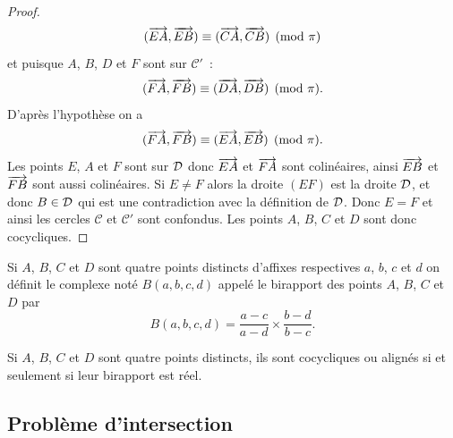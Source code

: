 \begin{proof}
\begin{equation}
  (\overrightarrow{EA},\overrightarrow{EB}) \equiv (\overrightarrow{CA},\overrightarrow{CB}) \pmod {\pi}  
\end{equation}
et puisque $A$, $B$, $D$ et $F$ sont sur $\mathcal{C}'$~:
\begin{equation}
  (\overrightarrow{FA},\overrightarrow{FB}) \equiv (\overrightarrow{DA},\overrightarrow{DB}) \pmod {\pi}.
\end{equation}
D'après l'hypothèse on a 
\begin{equation}
(\overrightarrow{FA},\overrightarrow{FB}) \equiv (\overrightarrow{EA},\overrightarrow{EB}) \pmod {\pi}.
\end{equation}
Les points $E$, $A$ et $F$ sont sur $\mathcal{D}$ donc $\overrightarrow{EA}$ et $\overrightarrow{FA}$ sont colinéaires, ainsi $\overrightarrow{EB}$ et $\overrightarrow{FB}$ sont aussi colinéaires. Si $E \neq F$ alors la droite $(EF)$ est la droite $\mathcal{D}$, et donc $B \in \mathcal{D}$ qui est une contradiction avec la définition de $\mathcal{D}$. Donc $E=F$ et ainsi les cercles $\mathcal{C}$ et $\mathcal{C}'$ sont confondus. Les points $A$, $B$, $C$ et $D$ sont donc cocycliques.
\end{proof}
\begin{defdef}
  Si $A$, $B$, $C$ et $D$ sont quatre points distincts d'affixes respectives $a$, $b$, $c$ et $d$ on définit le complexe noté $B(a,b,c,d)$ appelé le birapport des points $A$, $B$, $C$ et $D$ par
  \begin{equation}
    B(a,b,c,d)=\frac{a-c}{a-d} \times \frac{b-d}{b-c}.
  \end{equation}
\end{defdef}
\begin{theo}
  Si $A$, $B$, $C$ et $D$ sont quatre points distincts, ils sont cocycliques ou alignés si et seulement si leur birapport est réel.
\end{theo}

\subsection{Problème d'intersection}
